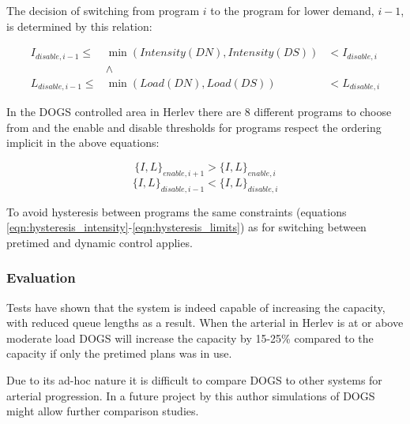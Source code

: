 The decision of switching from program $i$ to the program for lower demand, $i-1$, is determined by this relation:

\begin{eqnarray*}
I_{disable,i-1} \leq & \min(Intensity(DN),Intensity(DS)) & < I_{disable,i} \\
& \wedge & \\
L_{disable,i-1} \leq & \min(Load(DN),Load(DS))  & < L_{disable,i}
\end{eqnarray*}

In the DOGS controlled area in Herlev there are 8 different programs to choose from and the enable and disable thresholds for programs respect the ordering implicit in the above equations:

$$\lbrace I,L \rbrace_{enable,i+1} > \lbrace I,L \rbrace_{enable,i}$$
$$\lbrace I,L \rbrace_{disable,i-1} < \lbrace I,L \rbrace_{disable,i}$$

To avoid hysteresis between programs the same constraints (equations \ref{eqn:hysteresis_intensity}-\ref{eqn:hysteresis_limits}) as for switching between pretimed and dynamic control applies.

\subsubsection*{Evaluation}
Tests have shown that the system is indeed capable of increasing the capacity, with reduced queue lengths as a result. When the arterial in Herlev is at or above moderate load DOGS will increase the capacity by 15-25\% compared to the capacity if only the pretimed plans was in use.

Due to its ad-hoc nature it is difficult to compare DOGS to other systems for arterial progression. In a future project by this author simulations of DOGS might allow further comparison studies.